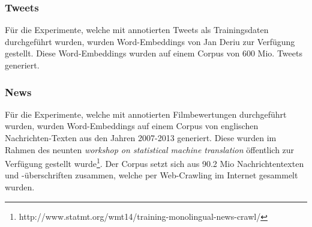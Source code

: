 \subsubsection{Tweets}
Für die Experimente, welche mit annotierten Tweets als Trainingsdaten durchgeführt wurden, wurden Word-Embeddings von Jan Deriu zur Verfügung gestellt. Diese Word-Embeddings wurden auf einem Corpus von 600 Mio. Tweets generiert.

\subsubsection{News}
Für die Experimente, welche mit annotierten Filmbewertungen durchgeführt wurden, wurden Word-Embeddings auf einem Corpus von englischen Nachrichten-Texten aus den Jahren 2007-2013 generiert. Diese wurden im Rahmen des neunten \emph{workshop on statistical machine translation} öffentlich zur Verfügung gestellt wurde\footnote{http://www.statmt.org/wmt14/training-monolingual-news-crawl/}. Der Corpus setzt sich aus 90.2 Mio Nachrichtentexten und -überschriften zusammen, welche per Web-Crawling im Internet gesammelt wurden. 